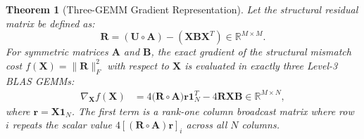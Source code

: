\documentclass[a4paper,fleqn]{cas-dc}
\theoremstyle{thmstyleone}
\newtheorem{theorem}{Theorem}
\theoremstyle{thmstyletwo}
\theoremstyle{thmstylethree}
\begin{document}
\begin{theorem}[Three-GEMM Gradient Representation]
\label{thm:gradient}
Let the structural residual matrix be defined as:
\begin{equation}
\mathbf{R} = (\mathbf{U} \circ \mathbf{A}) - (\mathbf{X}\mathbf{B}\mathbf{X}^T) \in \mathbb{R}^{M \times M}.
\label{eq:residual}
\end{equation}
For symmetric matrices $\mathbf{A}$ and $\mathbf{B}$, the exact gradient of the structural mismatch cost $f(\mathbf{X}) = \|\mathbf{R}\|_F^2$ with respect to $\mathbf{X}$ is evaluated in exactly three Level-3 BLAS GEMMs:
\begin{align}
\nabla_{\mathbf{X}} f(\mathbf{X}) &= 4\big(\mathbf{R} \circ \mathbf{A}\big)\mathbf{r}\mathbf{1}_N^T - 4\mathbf{R}\mathbf{X}\mathbf{B} \in \mathbb{R}^{M \times N},
\label{eq:exact_grad}
\end{align}
where $\mathbf{r} = \mathbf{X}\mathbf{1}_N$. The first term is a rank-one column broadcast matrix where row $i$ repeats the scalar value $4[(\mathbf{R} \circ \mathbf{A})\mathbf{r}]_i$ across all $N$ columns.
\end{theorem}
\end{document}
